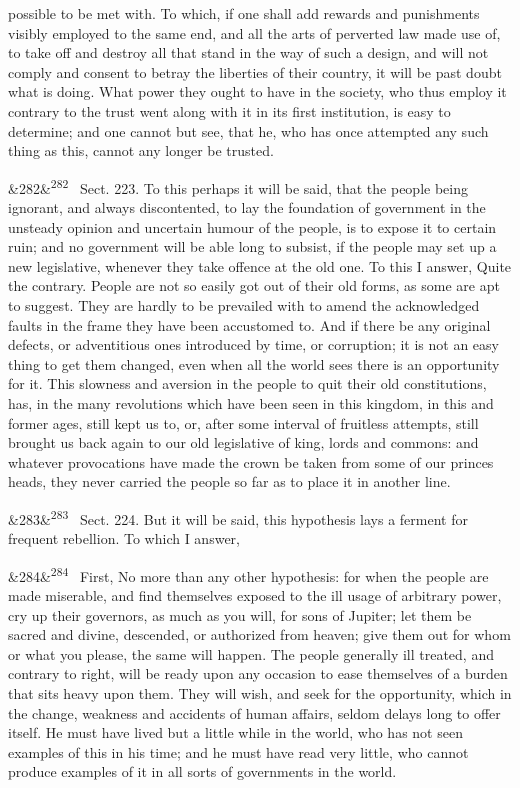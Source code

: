 \documentclass[12pt]{article}
\newcommand{\para}[1][]{\par\noindent\ifx&#1&\else\textsuperscript{\footnotesize #1}~\fi}
\begin{document}
possible to be met with. To which, if one shall add rewards and punishments visibly employed to the same end, and all the arts of perverted law made use of, to take off and destroy all that stand in the way of such a design, and will not comply and consent to betray the liberties of their country, it will be past doubt what is doing. What power they ought to have in the society, who thus employ it contrary to the trust went along with it in its first institution, is easy to determine; and one cannot but see, that he, who has once attempted any such thing as this, cannot any longer be trusted.

\para[282] Sect. 223. To this perhaps it will be said, that the people being ignorant, and always discontented, to lay the foundation of government in the unsteady opinion and uncertain humour of the people, is to expose it to certain ruin; and no government will be able long to subsist, if the people may set up a new legislative, whenever they take offence at the old one. To this I answer, Quite the contrary. People are not so easily got out of their old forms, as some are apt to suggest. They are hardly to be prevailed with to amend the acknowledged faults in the frame they have been accustomed to. And if there be any original defects, or adventitious ones introduced by time, or corruption; it is not an easy thing to get them changed, even when all the world sees there is an opportunity for it. This slowness and aversion in the people to quit their old constitutions, has, in the many revolutions which have been seen in this kingdom, in this and former ages, still kept us to, or, after some interval of fruitless attempts, still brought us back again to our old legislative of king, lords and commons: and whatever provocations have made the crown be taken from some of our princes heads, they never carried the people so far as to place it in another line.

\para[283] Sect. 224. But it will be said, this hypothesis lays a ferment for frequent rebellion. To which I answer,

\para[284] First, No more than any other hypothesis: for when the people are made miserable, and find themselves exposed to the ill usage of arbitrary power, cry up their governors, as much as you will, for sons of Jupiter; let them be sacred and divine, descended, or authorized from heaven; give them out for whom or what you please, the same will happen. The people generally ill treated, and contrary to right, will be ready upon any occasion to ease themselves of a burden that sits heavy upon them. They will wish, and seek for the opportunity, which in the change, weakness and accidents of human affairs, seldom delays long to offer itself. He must have lived but a little while in the world, who has not seen examples of this in his time; and he must have read very little, who cannot produce examples of it in all sorts of governments in the world.
\end{document}

